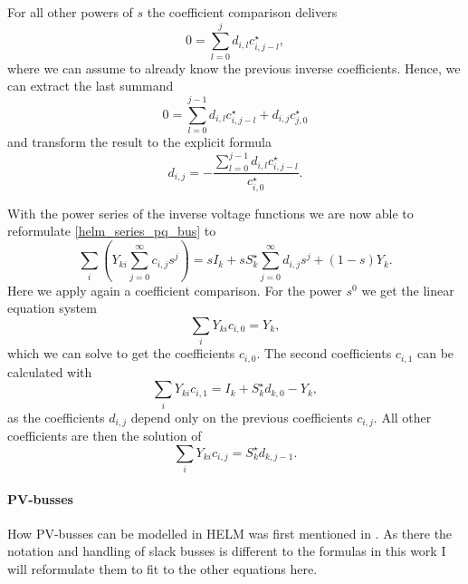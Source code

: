 For all other powers of $s$ the coefficient comparison delivers
\begin{equation}
	0 = \sum_{l = 0}^j d_{i,l} c_{i,j - l}^\star,
\end{equation}
where we can assume to already know the previous inverse coefficients. Hence, we can extract the last summand
\begin{equation}
	0 = \sum_{l = 0}^{j - 1} d_{i,l} c_{i,j - l}^\star + d_{i,j} c_{j,0}^\star
\end{equation}
and transform the result to the explicit formula 
\begin{equation}
	d_{i,j} = - \frac{\sum_{l = 0}^{j - 1} d_{i,l} c_{i,j - l}^\star}{c_{i,0}^\star}.
\end{equation}

With the power series of the inverse voltage functions we are now able to reformulate \eqref{helm_series_pq_bus} to
\begin{equation}
	\sum_i \left( Y_{ki} \sum_{j = 0}^\infty c_{i,j} s^j \right) = s I_k + s S_k^\star \sum_{j = 0}^\infty d_{i,j} s^j + (1 - s) Y_k.
\end{equation}
Here we apply again a coefficient comparison. For the power $s^0$ we get the linear equation system
\begin{equation}
	\sum_i Y_{ki} c_{i,0} = Y_k,
	\label{eq:helm_first_coefficients}
\end{equation}
which we can solve to get the coefficients $c_{i,0}$. The second coefficients $c_{i,1}$ can be calculated with
\begin{equation}
	\sum_i Y_{ki} c_{i,1} = I_k + S_k^\star d_{k,0} - Y_k,
	\label{eq:helm_second_coefficients}
\end{equation}
as the coefficients $d_{i,j}$ depend only on the previous coefficients $c_{i,j}$. All other coefficients are then the solution of
\begin{equation}
	\sum_i Y_{ki} c_{i,j} = S_k^\star d_{k,j - 1}.
	\label{eq:helm_other_coefficients}
\end{equation}

\paragraph{PV-busses}

How PV-busses can be modelled in HELM was first mentioned in \citep{helmPV}. As there the notation and handling of slack busses is different to the formulas in this work I will reformulate them to fit to the other equations here.

